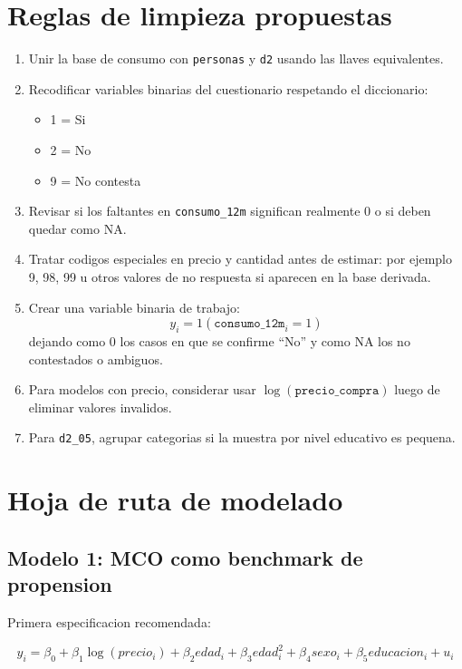 \documentclass[11pt]{article}
\begin{document}
\section{Reglas de limpieza propuestas}

\begin{enumerate}[leftmargin=*]
    \item Unir la base de consumo con \texttt{personas} y \texttt{d2} usando las llaves equivalentes.
    \item Recodificar variables binarias del cuestionario respetando el diccionario:
    \begin{itemize}[leftmargin=*]
        \item 1 = Si
        \item 2 = No
        \item 9 = No contesta
    \end{itemize}
    \item Revisar si los faltantes en \texttt{consumo\_12m} significan realmente 0 o si deben quedar como NA.
    \item Tratar codigos especiales en precio y cantidad antes de estimar:
    por ejemplo 9, 98, 99 u otros valores de no respuesta si aparecen en la base derivada.
    \item Crear una variable binaria de trabajo:
    \[
        y_i = 1(\texttt{consumo\_12m}_i = 1)
    \]
    dejando como 0 los casos en que se confirme ``No'' y como NA los no contestados o ambiguos.
    \item Para modelos con precio, considerar usar \(\log(\texttt{precio\_compra})\) luego de eliminar valores invalidos.
    \item Para \texttt{d2\_05}, agrupar categorias si la muestra por nivel educativo es pequena.
\end{enumerate}

\section{Hoja de ruta de modelado}

\subsection{Modelo 1: MCO como benchmark de propension}

Primera especificacion recomendada:

\[
    y_i = \beta_0 + \beta_1 \log(precio_i) + \beta_2 edad_i + \beta_3 edad_i^2 + \beta_4 sexo_i + \beta_5 educacion_i + u_i
\]
\end{document}
